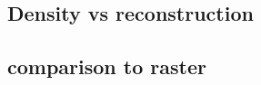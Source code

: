 \documentclass[letterpaper, 10 pt, conference]{ieeeconf}  %
\begin{document}
\subsection{Density vs reconstruction}
\subsection{comparison to raster}






% 
% 
\end{document}
